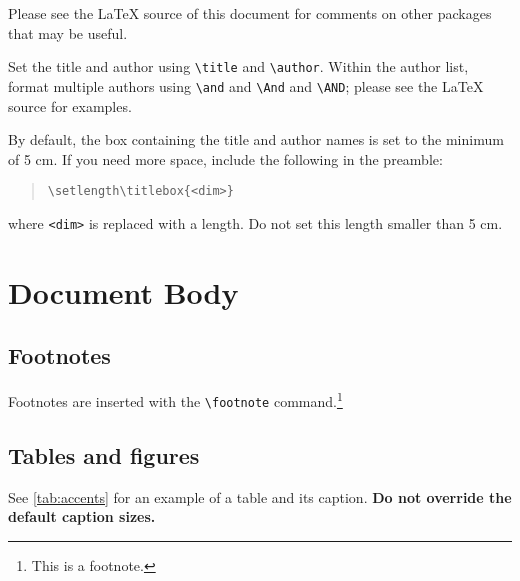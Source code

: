 \documentclass[11pt]{article}
\begin{document}
Please see the \LaTeX{} source of this document for comments on other packages that may be useful.

Set the title and author using \verb|\title| and \verb|\author|. Within the author list, format multiple authors using \verb|\and| and \verb|\And| and \verb|\AND|; please see the \LaTeX{} source for examples.

By default, the box containing the title and author names is set to the minimum of 5 cm. If you need more space, include the following in the preamble:
\begin{quote}
\begin{verbatim}
\setlength\titlebox{<dim>}
\end{verbatim}
\end{quote}
where \verb|<dim>| is replaced with a length. Do not set this length smaller than 5 cm.

\section{Document Body}

\subsection{Footnotes}
Footnotes are inserted with the \verb|\footnote| command.\footnote{This is a footnote.}

\subsection{Tables and figures}
See \cref{tab:accents} for an example of a table and its caption.
\textbf{Do not override the default caption sizes.}
\end{document}
